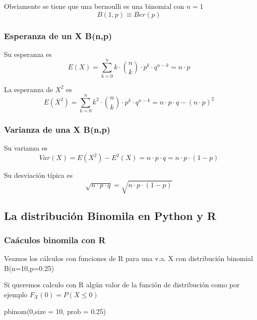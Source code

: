 \documentclass[
]{article}
\newenvironment{Shaded}{\begin{snugshade}}{\end{snugshade}}
\newcommand{\AttributeTok}[1]{\textcolor[rgb]{0.77,0.63,0.00}{#1}}
\newcommand{\DecValTok}[1]{\textcolor[rgb]{0.00,0.00,0.81}{#1}}
\newcommand{\FloatTok}[1]{\textcolor[rgb]{0.00,0.00,0.81}{#1}}
\newcommand{\FunctionTok}[1]{\textcolor[rgb]{0.00,0.00,0.00}{#1}}
\newcommand{\NormalTok}[1]{#1}
\begin{document}
Obviamente se tiene que una bernoulli es una binomial con \(n=1\)
\[B(1,p) \equiv Ber(p)\]

\hypertarget{esperanza-de-un-x-bnp}{%
\subsubsection{Esperanza de un X B(n,p)}\label{esperanza-de-un-x-bnp}}

Su esperanza es
\[E(X) = \sum_{k=0}^n k\cdot {n \choose k}\cdot p^k \cdot q^{n-k} = n\cdot p\]

La esperanza de \(X^2\) es
\[E(X^2) = \sum_{k=0}^n k^2\cdot {n\choose k}\cdot p^k \cdot q^{n-k} = n\cdot p\cdot q - (n\cdot p)^2\]

\hypertarget{varianza-de-una-x-bnp}{%
\subsubsection{Varianza de una X B(n,p)}\label{varianza-de-una-x-bnp}}

Su varianza es
\[Var(X) = E(X^2) - E^2(X) = n\cdot p\cdot q = n\cdot p \cdot (1-p)\]

Su desviación típica es
\[\sqrt{n\cdot p \cdot q} = \sqrt{n\cdot p \cdot (1-p)}\]

\hypertarget{la-distribuciuxf3n-binomila-en-python-y-r}{%
\subsection{La distribución Binomila en Python y
R}\label{la-distribuciuxf3n-binomila-en-python-y-r}}

\hypertarget{cauxe1culos-binomila-con-r}{%
\subsubsection{Caáculos binomila con
R}\label{cauxe1culos-binomila-con-r}}

Veamos los cálculos con funciones de R para una v.a. X con distribución
binomial B(n=10,p=0.25)

Si queremos calculo con R algún valor de la función de distribución como
por ejemplo \(F_X(0) = P(X\leq 0)\)

\begin{Shaded}
\begin{Highlighting}[]
\FunctionTok{pbinom}\NormalTok{(}\DecValTok{0}\NormalTok{,}\AttributeTok{size =} \DecValTok{10}\NormalTok{, }\AttributeTok{prob =} \FloatTok{0.25}\NormalTok{)}
\end{Highlighting}
\end{Shaded}
\end{document}
